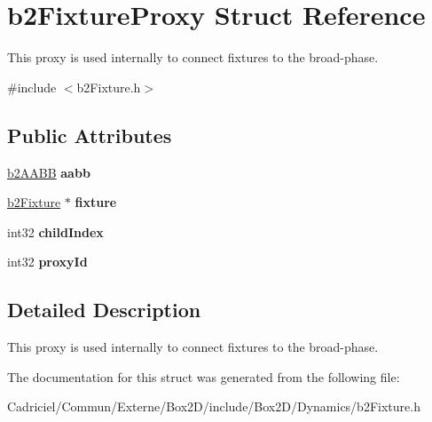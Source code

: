 \hypertarget{structb2_fixture_proxy}{}\section{b2\+Fixture\+Proxy Struct Reference}
\label{structb2_fixture_proxy}


This proxy is used internally to connect fixtures to the broad-\/phase.  




{\ttfamily \#include $<$b2\+Fixture.\+h$>$}

\subsection*{Public Attributes}
\begin{DoxyCompactItemize}
\item 
\hyperlink{structb2_a_a_b_b}{b2\+A\+A\+BB} {\bfseries aabb}\hypertarget{structb2_fixture_proxy_ad8950f61ce28cfa5b676065d4d843da7}{}\label{structb2_fixture_proxy_ad8950f61ce28cfa5b676065d4d843da7}

\item 
\hyperlink{classb2_fixture}{b2\+Fixture} $\ast$ {\bfseries fixture}\hypertarget{structb2_fixture_proxy_a3a0842dc9699c25658548c2005d0ef62}{}\label{structb2_fixture_proxy_a3a0842dc9699c25658548c2005d0ef62}

\item 
int32 {\bfseries child\+Index}\hypertarget{structb2_fixture_proxy_a2edb15552cf71f48dacc3608bb134166}{}\label{structb2_fixture_proxy_a2edb15552cf71f48dacc3608bb134166}

\item 
int32 {\bfseries proxy\+Id}\hypertarget{structb2_fixture_proxy_aa0ca7e71341368fe6c6913fb39c7283b}{}\label{structb2_fixture_proxy_aa0ca7e71341368fe6c6913fb39c7283b}

\end{DoxyCompactItemize}


\subsection{Detailed Description}
This proxy is used internally to connect fixtures to the broad-\/phase. 

The documentation for this struct was generated from the following file\+:\begin{DoxyCompactItemize}
\item 
Cadriciel/\+Commun/\+Externe/\+Box2\+D/include/\+Box2\+D/\+Dynamics/b2\+Fixture.\+h\end{DoxyCompactItemize}
